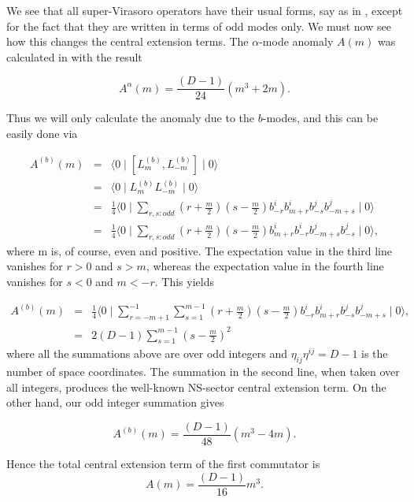 \documentclass[a4paper,a4paper]{article}
\begin{document}
We see that all super-Virasoro operators have their usual forms,
say as in \cite{GSW}, except for the fact that they are written in
terms of odd modes only. We must now see how this changes the central
extension terms. The $\alpha$-mode anomaly $A(m)$ was
calculated in \cite{Gursoy} with the result

\begin{equation}
A^{\alpha}(m)=\frac{(D-1)}{24}(m^{3}+2m).
\end{equation}

Thus we will only calculate the anomaly due to the $b$-modes, and
this can be easily done via

\begin{eqnarray}
A^{(b)}(m)&=&\langle0\mid[L_{m}^{(b)},L_{-m}^{(b)}]\mid0\rangle\\
          &=&\langle0\mid L_{m}^{(b)}L_{-m}^{(b)}\mid0\rangle\\
          &=&\frac{1}{4}\langle0\mid\sum_{r,s:odd}(r+\frac{m}{2})(s-\frac{m}{2})b_{-r}^{i}b_{m+r}^{i}b_{-s}^{j}b_{-m+s}^{j}\mid0\rangle\\
          &=&\frac{1}{4}\langle0\mid\sum_{r,s:odd}(r+\frac{m}{2})(s-\frac{m}{2})b_{m+r}^{i}b_{-r}^{i}b_{-m+s}^{j}b_{-s}^{j}\mid0\rangle,
\end{eqnarray}
where m is, of course, even and positive.  The expectation value
in the third line vanishes for $r>0$ and $s>m$, whereas the
expectation value in the fourth line vanishes for $s<0$ and
$m<-r$.  This yields

\begin{eqnarray}
A^{(b)}(m)&=&\frac{1}{4}\langle0\mid\sum_{r=-m+1}^{-1}\sum_{s=1}^{m-1}(r+\frac{m}{2})(s-\frac{m}{2})b_{-r}^{i}b_{m+r}^{i}b_{-s}^{j}b_{-m+s}^{j}\mid0\rangle, \\
          &=&2(D-1)\sum_{s=1}^{m-1}(s-\frac{m}{2})^{2}
\end{eqnarray}
where all the summations above are over odd integers and
$\eta_{ij}\eta^{ij}=D-1$ is the number of space coordinates.  The
summation in the second line, when taken over all integers,
produces the well-known NS-sector central extension term.  On the
other hand, our odd integer summation gives

\begin{equation}
A^{(b)}(m)=\frac{(D-1)}{48}(m^{3}-4m).
\end{equation}

Hence the total central extension term of the first commutator is
\begin{equation}
A(m)=\frac{(D-1)}{16}m^{3}.
\end{equation}
\end{document}
